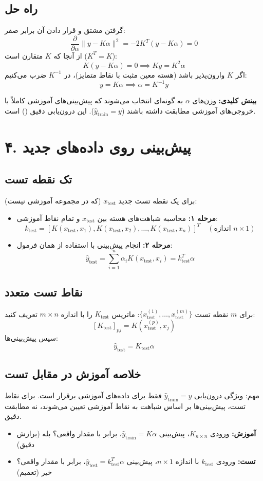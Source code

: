 \documentclass{article}
\begin{document}
\subsection*{راه حل}
گرفتن مشتق و قرار دادن آن برابر صفر:
\[
\frac{\partial}{\partial \alpha} \|y - K \alpha\|^2 = -2 K^T(y - K \alpha) = 0
\]
از آنجا که $K$ متقارن است ($K^T = K$):
\[
K(y - K \alpha) = 0 \implies K y = K^2 \alpha
\]
اگر $K$ وارون‌پذیر باشد (هسته معین مثبت با نقاط متمایز)، در $K^{-1}$ ضرب می‌کنیم:
\[
y = K \alpha \implies \alpha = K^{-1} y
\]

\textbf{بینش کلیدی:} وزن‌های $\alpha$ به گونه‌ای انتخاب می‌شوند که پیش‌بینی‌های آموزشی کاملاً با خروجی‌های آموزشی مطابقت داشته باشند ($\hat{y}_{\text{train}} = y$). این درون‌یابی دقیق () است.

\section*{۴. پیش‌بینی روی داده‌های جدید}

\subsection*{تک نقطه تست}
برای یک نقطه تست جدید $x_{\text{test}}$ (که در مجموعه آموزشی نیست):
\begin{itemize}
    \item \textbf{مرحله ۱:} محاسبه شباهت‌های هسته بین $x_{\text{test}}$ و تمام نقاط آموزشی:
    \[
    k_{\text{test}} = [K(x_{\text{test}}, x_1), K(x_{\text{test}}, x_2), \dots, K(x_{\text{test}}, x_n)]^T \quad (\text{اندازه } n \times 1)
    \]
    \item \textbf{مرحله ۲:} انجام پیش‌بینی با استفاده از همان فرمول:
    \[
    \hat{y}_{\text{test}} = \sum_{i=1}^{n} \alpha_i K(x_{\text{test}}, x_i) = k_{\text{test}}^T \alpha
    \]
\end{itemize}

\subsection*{نقاط تست متعدد}
برای $m$ نقطه تست $\{x^{(1)}_{\text{test}}, \dots, x^{(m)}_{\text{test}}\}$:
ماتریس $K_{\text{test}}$ را با اندازه $m \times n$ تعریف کنید:
\[
[K_{\text{test}}]_{pj} = K(x^{(p)}_{\text{test}}, x_j)
\]
سپس پیش‌بینی‌ها:
\[
\hat{y}_{\text{test}} = K_{\text{test}} \alpha
\]

\subsection*{خلاصه آموزش در مقابل تست}
مهم: ویژگی درون‌یابی $\hat{y}_{\text{train}} = y$ فقط برای داده‌های آموزشی برقرار است. برای نقاط تست، پیش‌بینی‌ها بر اساس شباهت به نقاط آموزشی تعیین می‌شوند، نه مطابقت دقیق.
\begin{itemize}
    \item \textbf{آموزش:} ورودی $K_{n \times n}$، پیش‌بینی $\hat{y}_{\text{train}} = K \alpha$، برابر با مقدار واقعی؟ بله (برازش دقیق)
    \item \textbf{تست:} ورودی $k_{\text{test}}$ با اندازه $n \times 1$، پیش‌بینی $\hat{y}_{\text{test}} = k_{\text{test}}^T \alpha$، برابر با مقدار واقعی؟ خیر (تعمیم)
\end{itemize}
\end{document}
